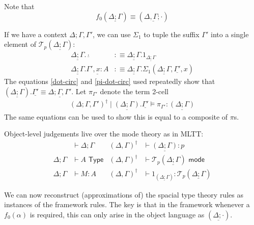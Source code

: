 \documentclass[10pt]{article}
\theoremstyle{definition}
\newcommand{\yields}{\vdash}
\newcommand{\TYPE}{\,\,\mathsf{Type}}
\newcommand{\type}{\,\,\mathsf{mode}}
\newcommand\TermTwo[4]{\ensuremath{#1 \mid #3 \vDash #2 : #4}}
\newcommand\El[2]{\mathcal{T}_{#1}(#2)}
\begin{document}
Note that \[f_0(\underline{\Delta ; \Gamma}) \equiv (\underline{\Delta, \Gamma ; \cdot})\]

If we have a context $\Delta; \Gamma, \Gamma'$, we can use $\Sigma_1$ to tuple the suffix $\Gamma'$ into a single element of $\El{p}{\underline{\Delta; \Gamma}}$:
\begin{align*}
\underline{\Delta ; \Gamma}. \underline{\cdot} &:\equiv \underline{\Delta ; \Gamma}.1_{\underline{\Delta ; \Gamma}}  \\
\underline{\Delta ; \Gamma}. \underline{\Gamma', x : A} &:\equiv \underline{\Delta ; \Gamma}.\Sigma_1(\underline{\Delta ; \Gamma}, \underline{\Gamma'}, x)
\end{align*}
The equations \eqref{dot-circ} and \eqref{pi-dot-circ} used repeatedly show that $(\underline{\Delta ; \Gamma}).\underline{\Gamma'} \equiv \underline{\Delta ; \Gamma, \Gamma'}$. Let $\pi_{\Gamma'}$ denote the term 2-cell
\begin{align*}
 \TermTwo{(\Delta ; \Gamma, \Gamma')^\dagger}{\pi_{\Gamma'}}{\underline{(\Delta ; \Gamma)}.\underline{\Gamma'}}{\underline{(\Delta ; \Gamma)}}
\end{align*}
The same equations can be used to show this is equal to a composite of $\pi$s.

Object-level judgements live over the mode theory as in MLTT:
\begin{align*}
&\yields \Delta;\Gamma & (\Delta, \Gamma)^\dagger &\yields \underline{(\Delta;\Gamma)} : p \\
\Delta ;\Gamma &\yields A \TYPE & (\Delta, \Gamma)^\dagger &\yields \El{p}{\underline{\Delta;\Gamma}} \type \\
\Delta;\Gamma &\yields M : A & (\Delta, \Gamma)^\dagger &\yields 1_{(\underline{\Delta;\Gamma})} : \El{p}{\underline{\Delta;\Gamma}}
\end{align*}

We can now reconstruct (approximations of) the spacial type theory rules as instances of the framework rules. The key is that in the framework whenever a $f_0(\alpha)$ is required, this can only arise in the object language as $(\underline{\Delta ; \cdot})$.
\end{document}
